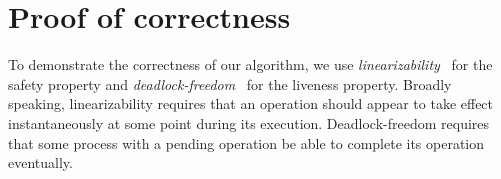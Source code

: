 \section{Proof of correctness}
To demonstrate the correctness of our algorithm, we use \emph{linearizability}~\cite{HerWin:1990:TOPLAS} for the safety property and \emph{deadlock-freedom}~\cite{HerSha:2012:Book} for the liveness property. Broadly speaking, linearizability requires that an operation should appear to take effect instantaneously at some point during its execution.  Deadlock-freedom requires that some process with a pending operation be able to complete its operation eventually.